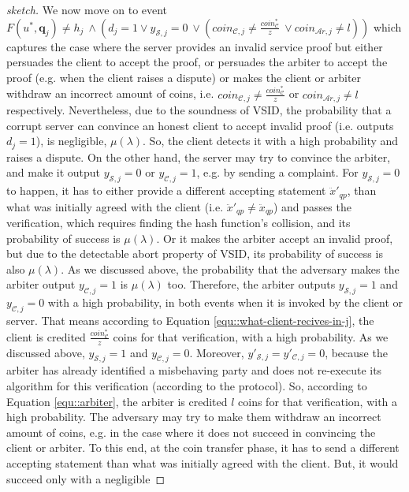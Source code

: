 \begin{proof}[sketch]
  
     We now move on to event $F(u^{\scriptscriptstyle *}, \bm{q}_{\scriptscriptstyle j})\neq h_{\scriptscriptstyle j} \ \wedge (d_{\scriptscriptstyle j}=1	\vee y_{\scriptscriptstyle \mathcal {S},j}=0 \ \vee (coin_{\scriptscriptstyle\mathcal{C},j}\neq \frac{coin_{\scriptscriptstyle\mathcal C}^{\scriptscriptstyle*}}{z} \ \vee  coin_{\scriptscriptstyle\mathcal{A}r,j}\neq l))$ which captures the case where the server provides an invalid service proof but either persuades the client to accept the proof, or  persuades the arbiter to accept the proof (e.g. when the client raises a dispute) or makes the client or arbiter withdraw an incorrect amount of coins, i.e.    $coin_{\scriptscriptstyle\mathcal{C},j}\neq \frac{coin_{\scriptscriptstyle\mathcal C}^{\scriptscriptstyle*}}{z}$ or $coin_{\scriptscriptstyle\mathcal{A}r,j}\neq l$ respectively.   Nevertheless, due to the soundness of VSID, the probability that a corrupt server can convince an honest client to accept invalid proof (i.e. outputs $d_{\scriptscriptstyle j}=1$), is negligible, $\mu(\lambda)$. So, the client detects it with a high probability and raises a dispute.  On the other hand, the server may try to convince the arbiter, and make it output $y_{\scriptscriptstyle \mathcal {S},j}=0$ or $y_{\scriptscriptstyle \mathcal {C},j}=1$, e.g. by sending a complaint. For $y_{\scriptscriptstyle \mathcal {S},j}=0$ to happen, it has to either provide a different accepting statement $\ddot{x}'_{\scriptscriptstyle qp}$, than what was initially agreed with the client (i.e. $\ddot{x}'_{\scriptscriptstyle qp}\neq \ddot{x}_{\scriptscriptstyle qp}$) and passes the verification, which   requires finding the hash function's collision, and its probability of success is   $\mu(\lambda)$. Or it makes the arbiter  accept an invalid proof, but due to the detectable abort property of VSID, its probability of success is also  $\mu(\lambda)$. As we discussed above, the probability that the adversary makes the arbiter output $y_{\scriptscriptstyle \mathcal {C},j}=1$ is  $\mu(\lambda)$ too. Therefore, the arbiter outputs $y_{\scriptscriptstyle \mathcal {S},j}=1$ and $y_{\scriptscriptstyle \mathcal {C},j}=0$  with a high probability, in both events when it is invoked by the client or  server. That means according to Equation \ref{equ::what-client-recives-in-j}, the client is credited $\frac{coin_{\scriptscriptstyle\mathcal C}^{\scriptscriptstyle*}}{z}$ coins for that verification, with a high probability.      As we discussed above, $y_{\scriptscriptstyle \mathcal {S},j}=1$ and $y_{\scriptscriptstyle \mathcal {C},j}=0$. Moreover, $y'_{\scriptscriptstyle \mathcal {S},j}=y'_{\scriptscriptstyle \mathcal {C},j}=0$, because  the arbiter has already identified a misbehaving party and does not re-execute its algorithm for this verification (according to the protocol). So, according to Equation \ref{equ::arbiter}, the arbiter is credited $l$ coins for that verification, with a high probability.  The adversary may  try to  make them withdraw an incorrect amount of coins, e.g. in the case where it does not succeed in convincing the client or arbiter. To this end,  at the coin transfer phase, it has to send a  different accepting statement  than what was initially agreed with the client. But, it would succeed only with a negligible 
\end{proof}
